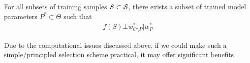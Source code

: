\begin{assumption}\label{assum:sub}
For all subsets of training samples $S \subset \mathcal{S}$, there exists a subset of trained model parameters $P^* \subset \Theta$ such that
\begin{align}\label{eq:assum}
    f(S) \bot w_{\Theta\setminus P}^* | w_{P}^*
\end{align}
\end{assumption}
Due to the computational issues discussed above, 
if we could make such a simple/principled selection scheme practical, it may offer significant 
benefits.




